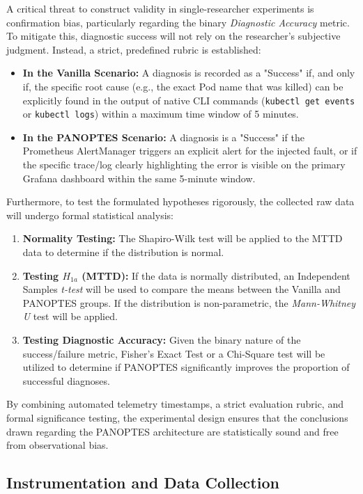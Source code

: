 A critical threat to construct validity in single-researcher experiments is confirmation bias, particularly regarding the binary \textit{Diagnostic Accuracy} metric. To mitigate this, diagnostic success will not rely on the researcher's subjective judgment. Instead, a strict, predefined rubric is established:
\begin{itemize}
    \item \textbf{In the Vanilla Scenario:} A diagnosis is recorded as a "Success" if, and only if, the specific root cause (e.g., the exact Pod name that was killed) can be explicitly found in the output of native CLI commands (\texttt{kubectl get events} or \texttt{kubectl logs}) within a maximum time window of 5 minutes.
    \item \textbf{In the PANOPTES Scenario:} A diagnosis is a "Success" if the Prometheus AlertManager triggers an explicit alert for the injected fault, or if the specific trace/log clearly highlighting the error is visible on the primary Grafana dashboard within the same 5-minute window.
\end{itemize}

Furthermore, to test the formulated hypotheses rigorously, the collected raw data will undergo formal statistical analysis:
\begin{enumerate}
    \item \textbf{Normality Testing:} The Shapiro-Wilk test will be applied to the MTTD data to determine if the distribution is normal.
    \item \textbf{Testing $H_{1a}$ (MTTD):} If the data is normally distributed, an Independent Samples \textit{t-test} will be used to compare the means between the Vanilla and PANOPTES groups. If the distribution is non-parametric, the \textit{Mann-Whitney U} test will be applied.
    \item \textbf{Testing Diagnostic Accuracy:} Given the binary nature of the success/failure metric, Fisher's Exact Test or a Chi-Square test will be utilized to determine if PANOPTES significantly improves the proportion of successful diagnoses.
\end{enumerate}

By combining automated telemetry timestamps, a strict evaluation rubric, and formal significance testing, the experimental design ensures that the conclusions drawn regarding the PANOPTES architecture are statistically sound and free from observational bias.

\subsection{Instrumentation and Data Collection}
\label{sec:data-collection}

